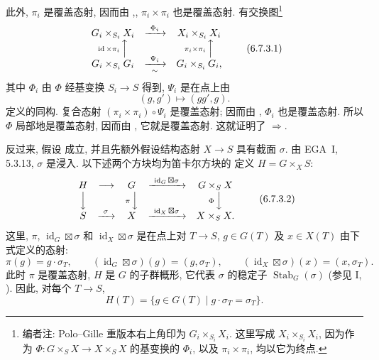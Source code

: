 此外, \(\pi_i\) 是覆盖态射, 因而由
,,
\(\pi_i\times\pi_i\) 也是覆盖态射.
有交换图\footnote{编者注: Polo--Gille 重版本右上角印为 \(G_i\times_{S_i}X_i\).
这里写成 \(X_i\times_{S_i}X_i\), 因为作为
\(\Phi:G\times_SX\to X\times_SX\) 的基变换的 \(\Phi_i\),
以及 \(\pi_i\times\pi_i\), 均以它为终点.}
\[
\begin{array}{ccccc}
  G_i\times_{S_i}X_i & \xrightarrow{\ \Phi_i\ } &
    X_i\times_{S_i}X_i\\
  \scriptstyle\operatorname{id}\times\pi_i\,\Big\uparrow
    & & \scriptstyle\pi_i\times\pi_i\,\Big\uparrow\\[-0.25em]
  G_i\times_{S_i}G_i & \xrightarrow[\sim]{\ \Psi_i\ } &
    G_i\times_{S_i}G_i ,
\end{array}
\tag{6.7.3.1}\label{sga3:iv:propdef:6:7:3:eq:6:7:3:1:01}
\]
其中 \(\Phi_i\) 由 \(\Phi\) 经基变换 \(S_i\to S\) 得到,
\(\Psi_i\) 是在点上由
\[
  (g,g')\longmapsto(gg',g).
\]
定义的同构.
复合态射 \((\pi_i\times\pi_i)\circ\Psi_i\) 是覆盖态射;
因而由 
,
\(\Phi_i\) 也是覆盖态射.
所以 \(\Phi\) 局部地是覆盖态射,
因而由 
, 它就是覆盖态射.
这就证明了 \(\Longrightarrow\).

反过来, 假设  成立,
并且先额外假设结构态射 \(X\to S\) 具有截面 \(\sigma\).
由 EGA~I, 5.3.13, \(\sigma\) 是浸入.
以下述两个方块均为笛卡尔方块的
定义 \(H=G\times_XS\):
\[
\begin{array}{ccccc}
  H & \longrightarrow & G
    & \xrightarrow{\ \operatorname{id}_G\boxtimes\sigma\ } & G\times_SX\\
  \Big\downarrow & & \scriptstyle\pi\,\Big\downarrow
    & & \scriptstyle\Phi\,\Big\downarrow\\[-0.25em]
  S & \xrightarrow{\ \sigma\ } & X
    & \xrightarrow{\ \operatorname{id}_X\boxtimes\sigma\ } & X\times_SX .
\end{array}
\tag{6.7.3.2}\label{sga3:iv:propdef:6:7:3:eq:6:7:3:2:01}
\]
这里, \(\pi\), \(\operatorname{id}_G\boxtimes\sigma\) 和
\(\operatorname{id}_X\boxtimes\sigma\) 是在点上对 \(T\to S\),
\(g\in G(T)\) 及 \(x\in X(T)\) 由下式定义的态射:
\[
 \pi(g)=g\cdot\sigma_T,\qquad
 (\operatorname{id}_G\boxtimes\sigma)(g)=(g,\sigma_T),\qquad
 (\operatorname{id}_X\boxtimes\sigma)(x)=(x,\sigma_T).
\]
此时 \(\pi\) 是覆盖态射, \(H\) 是 \(G\) 的子群概形,
它代表 \(\sigma\) 的稳定子 \(\operatorname{Stab}_G(\sigma)\)
(参见 I, ).
因此, 对每个 \(T\to S\),
\[
  H(T)=\{g\in G(T)\mid g\cdot\sigma_T=\sigma_T\}.
\]

